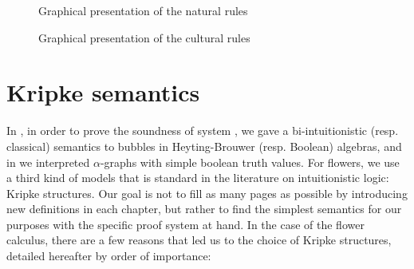\begin{figure*}[h!]
  
  \caption{Graphical presentation of the natural rules}
\end{figure*}

\begin{figure*}[h!]
  
  \caption{Graphical presentation of the cultural rules}
\end{figure*}

\section{Kripke semantics}

In , in order to prove the soundness of system
, we gave a bi-intuitionistic (resp. classical) semantics to bubbles in
Heyting-Brouwer (resp. Boolean) algebras, and in  we
interpreted $\alpha$-graphs with simple boolean truth values. For flowers, we
use a third kind of models that is standard in the literature on intuitionistic
logic: Kripke structures. Our goal is not to fill as many pages as possible by
introducing new definitions in each chapter, but rather to find the simplest
semantics for our purposes with the specific proof system at hand. In the case
of the flower calculus, there are a few reasons that led us to the choice of
Kripke structures, detailed hereafter by order of importance:
